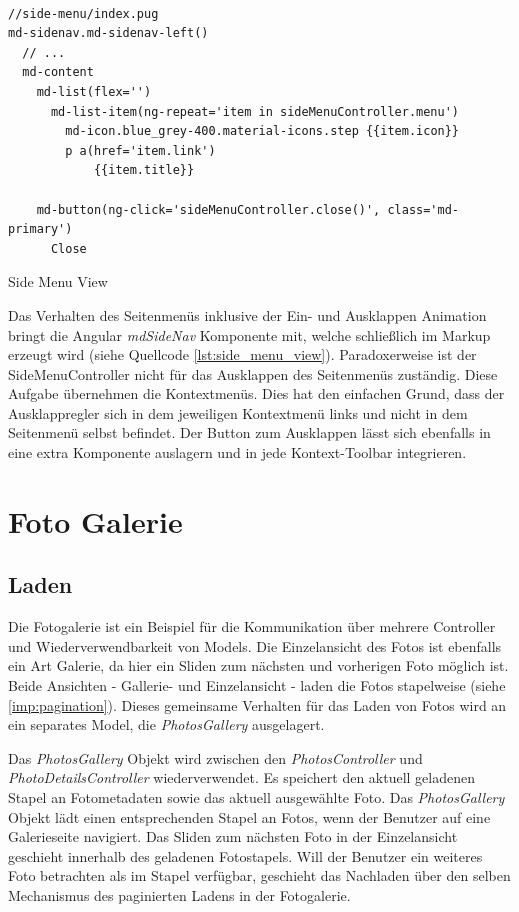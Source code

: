 \begin{listing}[H]
\begin{verbatim}

//side-menu/index.pug
md-sidenav.md-sidenav-left()
  // ...
  md-content
    md-list(flex='')
      md-list-item(ng-repeat='item in sideMenuController.menu')
        md-icon.blue_grey-400.material-icons.step {{item.icon}}
        p a(href='item.link')
            {{item.title}}

    md-button(ng-click='sideMenuController.close()', class='md-primary')
      Close

\end{verbatim}
\caption{Side Menu View}
\label{lst:side_menu_view}
\end{listing}

Das Verhalten des Seitenmenüs inklusive der Ein- und Ausklappen Animation bringt die Angular \emph{mdSideNav} Komponente mit, welche schließlich im Markup erzeugt wird (siehe Quellcode \ref{lst:side_menu_view}). Paradoxerweise ist der SideMenuController nicht für das Ausklappen des Seitenmenüs zuständig. Diese Aufgabe übernehmen die Kontextmenüs. Dies hat den einfachen Grund, dass der Ausklappregler sich in dem jeweiligen Kontextmenü links und nicht in dem Seitenmenü selbst befindet. Der Button zum Ausklappen lässt sich ebenfalls in eine extra Komponente auslagern und in jede Kontext-Toolbar integrieren.

\section{Foto Galerie}
\label{sec:photo_gallery}

\subsection{Laden}

Die Fotogalerie ist ein Beispiel für die Kommunikation über mehrere Controller und Wiederverwendbarkeit von Models. Die Einzelansicht des Fotos ist ebenfalls ein Art Galerie, da hier ein Sliden zum nächsten und vorherigen Foto möglich ist. Beide Ansichten - Gallerie- und Einzelansicht - laden die Fotos stapelweise (siehe \ref{imp:pagination}). Dieses gemeinsame Verhalten für das Laden von Fotos wird an ein separates Model, die \emph{PhotosGallery} ausgelagert.

Das \emph{PhotosGallery} Objekt wird zwischen den \emph{PhotosController} und \emph{PhotoDetailsController} wiederverwendet. Es speichert den aktuell geladenen Stapel an Fotometadaten sowie das aktuell ausgewählte Foto. Das \emph{PhotosGallery} Objekt lädt einen entsprechenden Stapel an Fotos, wenn der Benutzer auf eine Galerieseite navigiert. Das Sliden zum nächsten Foto in der Einzelansicht geschieht innerhalb des geladenen Fotostapels. Will der Benutzer ein weiteres Foto betrachten als im Stapel verfügbar, geschieht das Nachladen über den selben Mechanismus des paginierten Ladens in der Fotogalerie.

